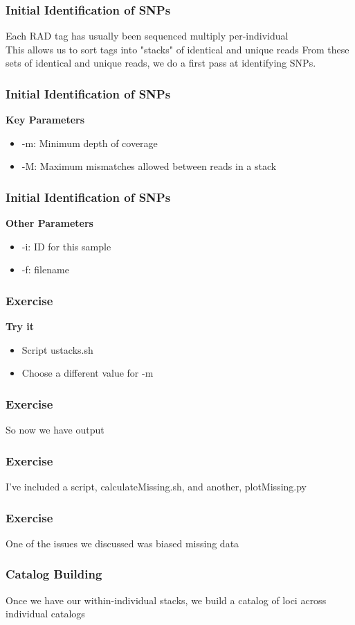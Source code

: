 \documentclass{beamer}
\begin{document}
\begin{frame}
\frametitle{Initial Identification of SNPs}
Each RAD tag has usually been sequenced multiply per-individual \\
This allows us to sort tags into "stacks" of identical and unique reads
From these sets of identical and unique reads, we do a first pass at identifying SNPs.
\end{frame}

\begin{frame}
\frametitle{Initial Identification of SNPs}
\textbf{Key Parameters}
\begin{itemize}
\item -m: Minimum depth of coverage
\item -M: Maximum mismatches allowed between reads in a stack
\end{itemize}
\end{frame}

\begin{frame}
\frametitle{Initial Identification of SNPs}
\textbf{Other Parameters}
\begin{itemize}
\item -i: ID for this sample
\item -f: filename
\end{itemize}
\end{frame}

\begin{frame}
\frametitle{Exercise}
\textbf{Try it}
\begin{itemize}
\item Script ustacks.sh
\item Choose a different value for -m
\end{itemize}
\end{frame}


\begin{frame}
\frametitle{Exercise}
So now we have output
\end{frame}

\begin{frame}
\frametitle{Exercise}
I've included a script, calculateMissing.sh, and another, plotMissing.py
\end{frame}

\begin{frame}
\frametitle{Exercise}
One of the issues we discussed was biased missing data
\end{frame}

\begin{frame}
\frametitle{Catalog Building}
Once we have our within-individual stacks, we build a catalog of loci across individual catalogs
\end{frame}
\end{document}
